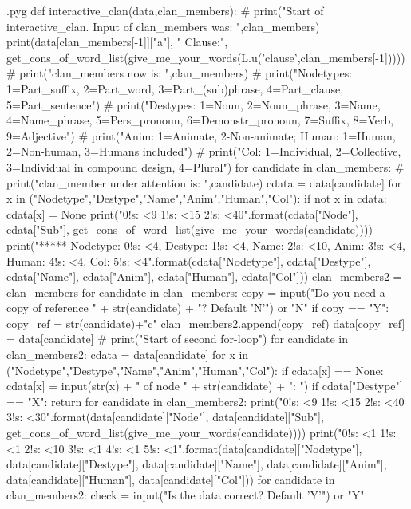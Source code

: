 \documentclass{report}
\makeatletter
\newenvironment{python}{%
  \VerbatimEnvironment
  \minted@resetoptions
  \setkeys{minted@opt}{}
      \begin{VerbatimOut}{\jobname.pyg}}
{%
      \end{VerbatimOut}
      \minted@pygmentize{python}
      \DeleteFile{\jobname.pyg}}
\makeatother
\begin{document}
\begin{python}
def interactive_clan(data,clan_members):
#    print("Start of interactive_clan. Input of clan_members was: ",clan_members)
    print(data[clan_members[-1]]["a"], " Clause:", get_cons_of_word_list(give_me_your_words(L.u('clause',clan_members[-1]))))
#    print("clan_members now is: ",clan_members)
#    print("Nodetypes: 1=Part_suffix, 2=Part_word, 3=Part_(sub)phrase, 4=Part_clause, 5=Part_sentence")
#    print("Destypes: 1=Noun, 2=Noun_phrase, 3=Name, 4=Name_phrase, 5=Pers_pronoun, 6=Demonstr_pronoun, 7=Suffix, 8=Verb, 9=Adjective")
#    print("Anim: 1=Animate, 2-Non-animate; Human: 1=Human, 2=Non-human, 3=Humans included")
#    print("Col: 1=Individual, 2=Collective, 3=Individual in compound design, 4=Plural")
    for candidate in clan_members:
#        print("clan_member under attention is: ",candidate)
        cdata = data[candidate]
        for x in ("Nodetype","Destype","Name","Anim","Human","Col"):
            if not x in cdata:
                cdata[x] = None
        print("{0!s: <9} {1!s: <15} {2!s: <40}".format(cdata["Node"], cdata["Sub"], get_cons_of_word_list(give_me_your_words(candidate))))
        print("***** Nodetype: {0!s: <4}, Destype: {1!s: <4}, Name: {2!s: <10}, Anim: {3!s: <4}, Human: {4!s: <4}, Col: {5!s: <4}".format(cdata["Nodetype"], cdata["Destype"], cdata["Name"], cdata["Anim"], cdata["Human"], cdata["Col"]))
    clan_members2 = clan_members
    for candidate in clan_members:
        copy = input("Do you need a copy of reference " + str(candidate) + "? Default 'N'") or "N"
        if copy == "Y":
            copy_ref = str(candidate)+"c"
            clan_members2.append(copy_ref)
            data[copy_ref] = data[candidate]
#    print("Start of second for-loop")
    for candidate in clan_members2:
        cdata = data[candidate]
        for x in ("Nodetype","Destype","Name","Anim","Human","Col"):
            if cdata[x] == None:
                cdata[x] = input(str(x) + " of node " + str(candidate) + ": ")
                if cdata["Destype"] == "X":
                    return
    for candidate in clan_members2:
        print("{0!s: <9} {1!s: <15} {2!s: <40} {3!s: <30}".format(data[candidate]["Node"], data[candidate]["Sub"], get_cons_of_word_list(give_me_your_words(candidate))))
        print("{0!s: <1} {1!s: <1} {2!s: <10} {3!s: <1} {4!s: <1} {5!s: <1}".format(data[candidate]["Nodetype"], data[candidate]["Destype"], data[candidate]["Name"], data[candidate]["Anim"], data[candidate]["Human"], data[candidate]["Col"]))
    for candidate in clan_members2:
        check = input("Is the data correct? Default 'Y'") or "Y"

\end{python}
\end{document}
